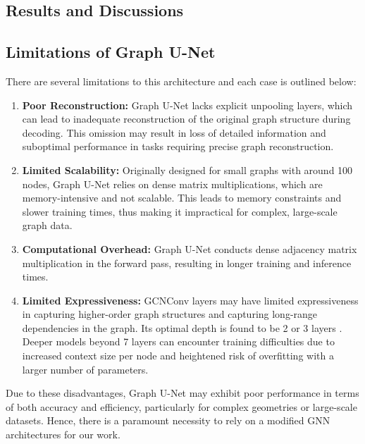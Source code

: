 \subsection{Results and Discussions}
\subsection{Limitations of Graph U-Net}
There are several limitations to this architecture and each case is outlined below: 
\begin{enumerate}
    \item \textbf{Poor Reconstruction:} Graph U-Net lacks explicit unpooling layers, which can lead to inadequate reconstruction of the original graph structure during decoding. This omission may result in loss of detailed information and suboptimal performance in tasks requiring precise graph reconstruction.
    \item \textbf{Limited Scalability:} Originally designed for small graphs with around 100 nodes, Graph U-Net relies on dense matrix multiplications, which are memory-intensive and not scalable. This leads to memory constraints and slower training times, thus making it impractical for complex, large-scale graph data.
    \item \textbf{Computational Overhead:} Graph U-Net conducts dense adjacency matrix multiplication in the forward pass, resulting in longer training and inference times.
    \item \textbf{Limited Expressiveness:} GCNConv layers may have limited expressiveness in capturing higher-order graph structures and capturing long-range dependencies in the graph. Its optimal depth is found to be 2 or 3 layers \cite{kipf}. Deeper models beyond 7 layers can encounter training difficulties due to increased context size per node and heightened risk of overfitting with a larger number of parameters.
\end{enumerate}
Due to these disadvantages, Graph U-Net may exhibit poor performance in terms of both accuracy and efficiency, particularly for complex geometries or large-scale datasets. Hence, there is a paramount necessity to rely on a modified GNN architectures for our work.
